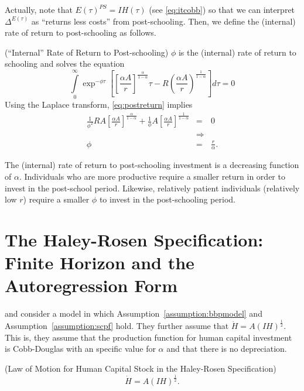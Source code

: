 \indent Actually, note that $E(\tau)^{PS} = IH(\tau)$ (see \eqref{eq:itcobb}) so that we can interpret $\Delta^{E(\tau)}$ as ``returns less costs'' from post-schooling. Then, we define the (internal) rate of return to post-schooling as follows.

\begin{definition} (``Internal'' Rate of Return to Post-schooling)
$\phi$ is the (internal) rate of return to schooling and solves the equation
\begin{equation}
\int \limits _{0} ^{\infty} \exp^{- \phi \tau} \left[ \left[ \frac{\alpha A}{r} \right]^{\frac{\alpha}{1-\alpha}} \tau - R \left( \frac{\alpha A}{r} \right)^{\frac{1}{1 - \alpha}} \right] d \tau = 0 \label{eq:postreturn}
\end{equation}
\noindent Using the Laplace transform, \eqref{eq:postreturn} implies
\begin{eqnarray}
\frac{1}{\phi^2} RA \left[ \frac{\alpha A}{r} \right]^{\frac{\alpha}{1-\alpha}} + \frac{1}{\phi} A \left[ \frac{\alpha A}{r} \right]^{\frac{1}{1-\alpha}} &=& 0 \nonumber \\
&\Rightarrow& \nonumber \\
\phi &=& \frac{r}{\alpha}.
\end{eqnarray}
\end{definition}

\indent The (internal) rate of return to post-schooling investment is a decreasing function of $\alpha$. Individuals who are more productive require a smaller return in order to invest in the post-school period. Likewise, relatively patient individuals (relatively low $r$) require a smaller $\phi$ to invest in the post-schooling period. 

\section{The Haley-Rosen Specification: Finite Horizon and the Autoregression Form}

\citet{haley1976estimation} and \citet{rosen1976theory} consider a model in which  Assumption~\ref{assumption:bbpmodel} and Assumption~\ref{assumption:scpf} hold. They further assume that $\dot{H} = A \left( IH \right)^{\frac{1}{2}}$. This is, they assume that the production function for human capital investment is Cobb-Douglas with an specific value for $\alpha$ and that there is no depreciation.

\begin{definition} (Law of Motion for Human Capital Stock in the Haley-Rosen Specification)
\begin{equation}
\dot{H} = A \left( IH \right)^{\frac{1}{2}} \label{eq:halroslaw}.
\end{equation}
\end{definition}

